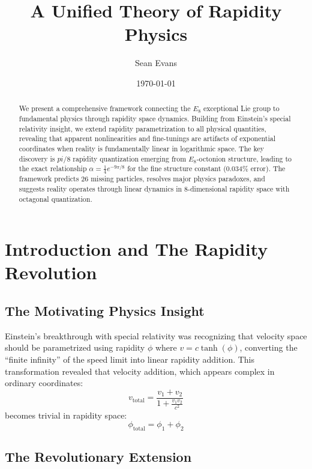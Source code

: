\documentclass[12pt,a4paper]{article}
\title{A Unified Theory of Rapidity Physics}
\author{Sean Evans}
\date{\today}
\begin{document}
\maketitle

\begin{abstract}
We present a comprehensive framework connecting the $E_{8}$ exceptional Lie group to fundamental physics through rapidity space dynamics. Building from Einstein's special relativity insight, we extend rapidity parametrization to all physical quantities, revealing that apparent nonlinearities and fine-tunings are artifacts of exponential coordinates when reality is fundamentally linear in logarithmic space. The key discovery is $pi/8$ rapidity quantization emerging from $E_{8}$-octonion structure, leading to the exact relationship $\alpha = \frac{1}{4}e^{-9\pi/8}$ for the fine structure constant (0.034\% error). The framework predicts 26 missing particles, resolves major physics paradoxes, and suggests reality operates through linear dynamics in 8-dimensional rapidity space with octagonal quantization.
\end{abstract}

\section{Introduction and The Rapidity Revolution}

\subsection{The Motivating Physics Insight}

Einstein's breakthrough with special relativity was recognizing that velocity space should be parametrized using rapidity $\phi$ where $v = c\tanh(\phi)$, converting the ``finite infinity'' of the speed limit into linear rapidity addition. This transformation revealed that velocity addition, which appears complex in ordinary coordinates:
\begin{equation}
v_{\text{total}} = \frac{v_1 + v_2}{1 + \frac{v_1 v_2}{c^2}}
\end{equation}
becomes trivial in rapidity space:
\begin{equation}
\phi_{\text{total}} = \phi_1 + \phi_2
\end{equation}

\subsection{The Revolutionary Extension}
\end{document}
